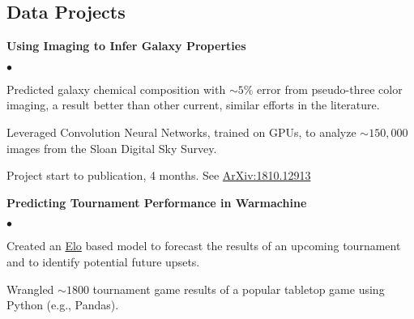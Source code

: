 \documentclass[margin,line, 11pt]{res}
\newenvironment{list2}{
  \begin{list}{$\bullet$}{%
      \setlength{\itemsep}{0in}
      \setlength{\parsep}{0in} \setlength{\parskip}{0in}
      \setlength{\topsep}{0in} \setlength{\partopsep}{0in}
      \setlength{\leftmargin}{0.2in}}}{\end{list}}
\begin{document}
\begin{resume}
\section{Data Projects}
\textbf{Using Imaging to Infer Galaxy Properties}\newline
    \begin{list2}
    	\vspace*{-5mm}
      \item Predicted galaxy chemical composition with $\sim5\%$ error from pseudo-three color imaging, a result better than other current, similar efforts in the literature.
    	\item Leveraged Convolution Neural Networks, trained on GPUs, to analyze $\sim150,000$ images from the Sloan Digital Sky Survey.
      \item Project start to publication, 4 months. See \href{http://arxiv.org/abs/1810.12913}{ArXiv:1810.12913}
    \end{list2}
    \vspace*{-4mm}
\textbf{Predicting Tournament Performance in Warmachine}\newline
    \begin{list2}
    	\vspace*{-5mm}
    	\item Created an \href{https://en.wikipedia.org/wiki/Elo_rating_system}{Elo} based model to forecast the results of an upcoming tournament and to identify potential future upsets.
    	\item Wrangled $\sim1800$ tournament game results of a popular tabletop game using Python (e.g., Pandas).
    \end{list2}
\vspace*{-2mm}


\end{resume}
\end{document}
